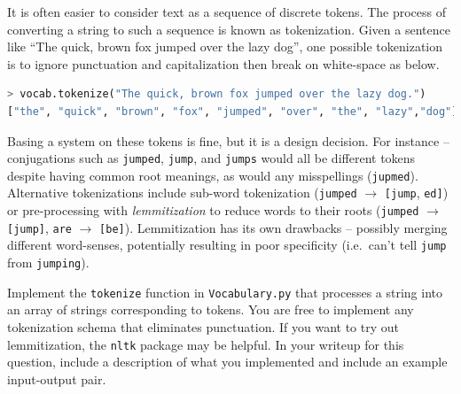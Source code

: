 \documentclass[a4paper,10pt]{article}
\begin{document}
 It is often easier to consider text as a sequence of discrete tokens. The process of converting a string to such a sequence is known as tokenization. Given a sentence like ``The quick, brown fox jumped over the lazy dog'', one possible tokenization is to ignore punctuation and capitalization then break on white-space as below.
%
\begin{center}
\begin{minipage}{0.95\textwidth}
\begin{lstlisting}[language=Python]
> vocab.tokenize("The quick, brown fox jumped over the lazy dog.")
["the", "quick", "brown", "fox", "jumped", "over", "the", "lazy","dog"]
\end{lstlisting}
\end{minipage}
\end{center}
%
Basing a system on these tokens is fine, but it is a design decision. For instance -- conjugations such as \texttt{jumped}, \texttt{jump}, and \texttt{jumps} would all be different tokens despite having common root meanings, as would any misspellings (\texttt{jupmed}). Alternative tokenizations include sub-word tokenization (\texttt{jumped} $\rightarrow$ \texttt{[jump}, \texttt{ed]}) or pre-processing with \emph{lemmitization} to reduce words to their roots (\texttt{jumped} $\rightarrow$ \texttt{[jump]}, \texttt{are} $\rightarrow$ \texttt{[be]}). Lemmitization has its own drawbacks -- possibly merging different word-senses, potentially resulting in poor specificity (i.e.~can't tell \texttt{jump} from \texttt{jumping}).

\vspace{5pt}
\begin{taskbox}
 Implement the \texttt{tokenize} function in \texttt{Vocabulary.py} that processes a string into an array of strings corresponding to tokens. You are free to implement any tokenization schema that eliminates punctuation. If you want to try out lemmitization, the \texttt{nltk} package may be helpful. In your writeup for this question, include a description of what you implemented and include an example input-output pair.
\end{taskbox}
\vspace{5pt}
\end{document}
